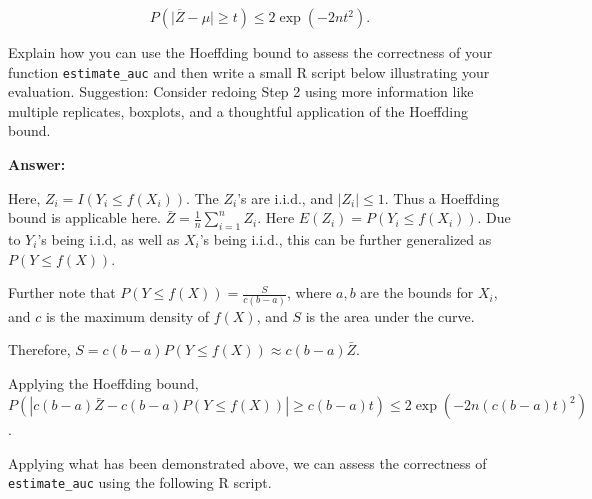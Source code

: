 \documentclass[
]{article}
\begin{document}
\[
P(\lvert \overline{Z} - \mu \rvert \geq t) \leq 2 \exp(-2 n t^2).
\]

Explain how you can use the Hoeffding bound to assess the correctness of
your function \texttt{estimate\_auc} and then write a small R script
below illustrating your evaluation. Suggestion: Consider redoing Step 2
using more information like multiple replicates, boxplots, and a
thoughtful application of the Hoeffding bound.

\textbf{Answer:}

Here, \(Z_i = I(Y_i \leq f(X_i))\). The \(Z_i\)'s are i.i.d., and
\(|Z_i| \leq 1\). Thus a Hoeffding bound is applicable here.
\(\bar{Z} = \frac{1}{n}\sum_{i=1}^nZ_i\). Here
\(E(Z_i) = P(Y_i \leq f(X_i))\). Due to \(Y_i\)'s being i.i.d, as well
as \(X_i\)'s being i.i.d., this can be further generalized as
\(P(Y\leq f(X))\).

Further note that \(P(Y\leq f(X)) = \frac{S}{c(b-a)}\), where \(a,b\)
are the bounds for \(X_i\), and \(c\) is the maximum density of
\(f(X)\), and \(S\) is the area under the curve.

Therefore, \(S = c(b-a)P(Y \leq f(X))\approx c(b-a)\bar{Z}\).

Applying the Hoeffding bound,
\(P(|c(b-a)\bar{Z} - c(b-a)P(Y\leq f(X))| \geq c(b-a)t)\leq 2\exp(-2n(c(b-a)t)^2)\).

Applying what has been demonstrated above, we can assess the correctness
of \texttt{estimate\_auc} using the following R script.
\end{document}
